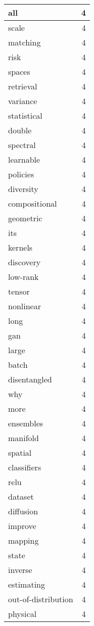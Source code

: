 \begin{table}[h]
\begin{tabular}{|l|r|}
all & 4 \\
\hline
scale & 4 \\
\hline
matching & 4 \\
\hline
risk & 4 \\
\hline
spaces & 4 \\
\hline
retrieval & 4 \\
\hline
variance & 4 \\
\hline
statistical & 4 \\
\hline
double & 4 \\
\hline
spectral & 4 \\
\hline
learnable & 4 \\
\hline
policies & 4 \\
\hline
diversity & 4 \\
\hline
compositional & 4 \\
\hline
geometric & 4 \\
\hline
its & 4 \\
\hline
kernels & 4 \\
\hline
discovery & 4 \\
\hline
low-rank & 4 \\
\hline
tensor & 4 \\
\hline
nonlinear & 4 \\
\hline
long & 4 \\
\hline
gan & 4 \\
\hline
large & 4 \\
\hline
batch & 4 \\
\hline
disentangled & 4 \\
\hline
why & 4 \\
\hline
more & 4 \\
\hline
ensembles & 4 \\
\hline
manifold & 4 \\
\hline
spatial & 4 \\
\hline
classifiers & 4 \\
\hline
relu & 4 \\
\hline
dataset & 4 \\
\hline
diffusion & 4 \\
\hline
improve & 4 \\
\hline
mapping & 4 \\
\hline
state & 4 \\
\hline
inverse & 4 \\
\hline
estimating & 4 \\
\hline
out-of-distribution & 4 \\
\hline
physical & 4 \\

\end{tabular}
\end{table}
